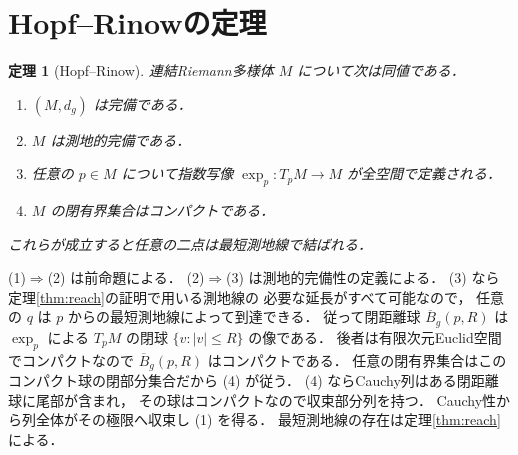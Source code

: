 \documentclass[a5paper,10pt,onecolumn]{jsarticle}
\makeatletter
\theoremstyle{mathnotetheorem}
\newtheorem{theorem}{定理}[section]
\renewcommand{\proofname}{証明}
\renewenvironment{proof}[1][\proofname]{%
  \par\pushQED{\qed}\normalfont\topsep4\p@\@plus2\p@\relax
  \trivlist\item[\hskip\labelsep\bfseries #1]\ignorespaces
}{\popQED\endtrivlist\@endpefalse}
\makeatother
\begin{document}
\section{Hopf–Rinowの定理}
\begin{theorem}[Hopf--Rinow]\label{thm:hopf}
連結Riemann多様体 $M$ について次は同値である．
\begin{enumerate}
\item $(M,d_g)$ は完備である．
\item $M$ は測地的完備である．
\item 任意の $p\in M$ について指数写像
 $\exp_p:T_pM\to M$ が全空間で定義される．
\item $M$ の閉有界集合はコンパクトである．
\end{enumerate}
これらが成立すると任意の二点は最短測地線で結ばれる．
\end{theorem}
\begin{proof}
(1)$\Rightarrow$(2) は前命題による．
(2)$\Rightarrow$(3) は測地的完備性の定義による．
(3) なら定理\ref{thm:reach}の証明で用いる測地線の
必要な延長がすべて可能なので，
任意の $q$ は $p$ からの最短測地線によって到達できる．
従って閉距離球
$\overline B_g(p,R)$ は
$\exp_p$ による $T_pM$ の閉球
$\{v:|v|\le R\}$ の像である．
後者は有限次元Euclid空間でコンパクトなので
$\overline B_g(p,R)$ はコンパクトである．
任意の閉有界集合はこのコンパクト球の閉部分集合だから
(4) が従う．
(4) ならCauchy列はある閉距離球に尾部が含まれ，
その球はコンパクトなので収束部分列を持つ．
Cauchy性から列全体がその極限へ収束し (1) を得る．
最短測地線の存在は定理\ref{thm:reach}による．
\end{proof}
\end{document}
